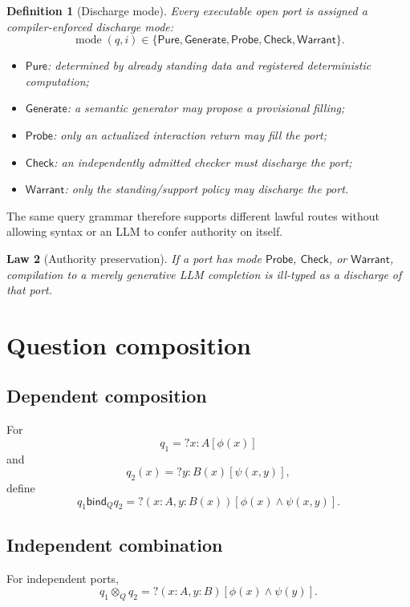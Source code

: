 \documentclass[11pt,oneside]{article}
\newtheorem{definition}{Definition}[section]
\newtheorem{law}[definition]{Law}
\newcommand{\bind}{\mathbin{\mathsf{bind}}}
\begin{document}
\begin{definition}[Discharge mode]
Every executable open port is assigned a compiler-enforced discharge mode:
\[
\boxed{
\operatorname{mode}(q,i)
\in
\{
\mathsf{Pure},
\mathsf{Generate},
\mathsf{Probe},
\mathsf{Check},
\mathsf{Warrant}
\}.
}
\]

\begin{itemize}
\item \(\mathsf{Pure}\): determined by already standing data and registered deterministic computation;
\item \(\mathsf{Generate}\): a semantic generator may propose a provisional filling;
\item \(\mathsf{Probe}\): only an actualized interaction return may fill the port;
\item \(\mathsf{Check}\): an independently admitted checker must discharge the port;
\item \(\mathsf{Warrant}\): only the standing/support policy may discharge the port.
\end{itemize}
\end{definition}

The same query grammar therefore supports different lawful routes without allowing syntax or an LLM to confer authority on itself.

\begin{law}[Authority preservation]
If a port has mode \(\mathsf{Probe}\), \(\mathsf{Check}\), or \(\mathsf{Warrant}\), compilation to a merely generative LLM completion is ill-typed as a discharge of that port.
\end{law}

\section{Question composition}

\subsection{Dependent composition}

For
\[
q_1=?x:A[\phi(x)]
\]
and
\[
q_2(x)=?y:B(x)[\psi(x,y)],
\]
define
\[
\boxed{
q_1\bind_{\!Q} q_2
=
?(x:A,y:B(x))[
\phi(x)\land\psi(x,y)
].
}
\]

\subsection{Independent combination}

For independent ports,
\[
\boxed{
q_1\otimes_Q q_2
=
?(x:A,y:B)[
\phi(x)\land\psi(y)
].
}
\]
\end{document}
